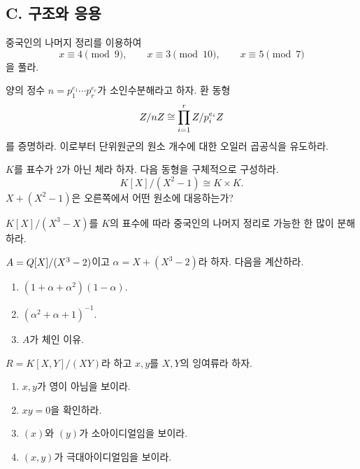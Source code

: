 \subsection*{C. 구조와 응용}

\begin{exercise}[*]
중국인의 나머지 정리를 이용하여
\[
  x\equiv4\pmod9,\qquad
  x\equiv3\pmod{10},\qquad
  x\equiv5\pmod7
\]
을 풀라.
\end{exercise}

\begin{exercise}
양의 정수 $n=p_1^{e_1}\cdots p_r^{e_r}$가 소인수분해라고 하자. 환 동형
\[
  Z/nZ\cong
  \prod_{i=1}^rZ/p_i^{e_i}Z
\]
를 증명하라. 이로부터 단위원군의 원소 개수에 대한 오일러 곱공식을 유도하라.
\end{exercise}

\begin{exercise}[*]
$K$를 표수가 $2$가 아닌 체라 하자. 다음 동형을 구체적으로 구성하라.
\[
  K[X]/(X^2-1)\cong K\times K.
\]
$X+(X^2-1)$은 오른쪽에서 어떤 원소에 대응하는가?
\end{exercise}

\begin{exercise}
$K[X]/(X^3-X)$를 $K$의 표수에 따라 중국인의 나머지 정리로 가능한 한 많이 분해하라.
\end{exercise}

\begin{exercise}[*]
$A=Q[X]/(X^3-2)$이고 $\alpha=X+(X^3-2)$라 하자. 다음을 계산하라.
\begin{enumerate}[label=(\alph*)]
  \item $(1+\alpha+\alpha^2)(1-\alpha)$.
  \item $(\alpha^2+\alpha+1)^{-1}$.
  \item $A$가 체인 이유.
\end{enumerate}
\end{exercise}

\begin{exercise}
$R=K[X,Y]/(XY)$라 하고 $x,y$를 $X,Y$의 잉여류라 하자.
\begin{enumerate}[label=(\alph*)]
  \item $x,y$가 영이 아님을 보이라.
  \item $xy=0$을 확인하라.
  \item $(x)$와 $(y)$가 소아이디얼임을 보이라.
  \item $(x,y)$가 극대아이디얼임을 보이라.
\end{enumerate}
\end{exercise}

